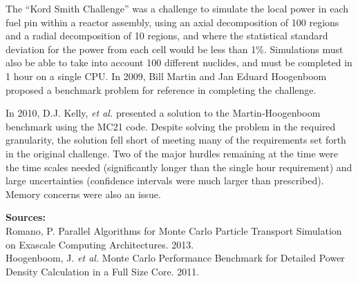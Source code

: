 \documentclass{article}
\begin{document}
The ``Kord Smith Challenge'' was a challenge to simulate the local power in each fuel pin within a reactor assembly, using an axial decomposition of 100 regions and a radial decomposition of 10 regions, and where the statistical standard deviation for the power from each cell would be less than 1\%. Simulations must also be able to take into account 100 different nuclides, and must be completed in 1 hour on a single CPU. In 2009, Bill Martin and Jan Eduard Hoogenboom proposed a benchmark problem for reference in completing the challenge. 

In 2010, D.J. Kelly, \textit{et al.} presented a solution to the Martin-Hoogenboom benchmark using the MC21 code. Despite solving the problem in the required granularity, the solution fell short of meeting many of the requirements set forth in the original challenge. Two of the major hurdles remaining at the time were the time scales needed (significantly longer than the single hour requirement) and large uncertainties (confidence intervals were much larger than prescribed). Memory concerns were also an issue.

\textbf{Sources:}\\
Romano, P. Parallel Algorithms for Monte Carlo Particle Transport Simulation on
Exascale Computing Architectures. 2013. \\
Hoogenboom, J. \textit{et al.} Monte Carlo Performance Benchmark for Detailed Power Density Calculation in a Full Size Core. 2011. \\



\end{document}

